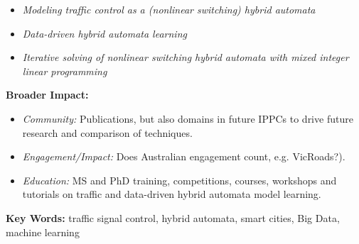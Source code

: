 {\begin{itemize}
\item {\it Modeling traffic control as a (nonlinear switching) hybrid automata}
\item {\it Data-driven hybrid automata learning} 
\item {\it Iterative solving of nonlinear switching hybrid automata with mixed integer linear programming}
\end{itemize}

\blankline

{\bf Broader Impact:}

\begin{itemize}
\item {\it Community:} Publications, but also domains in future IPPCs
  to drive future research and comparison of techniques.
\item {\it Engagement/Impact:} Does Australian engagement count,
  e.g. VicRoads?).
\item {\it Education:} MS and PhD training, competitions, courses,
  workshops and tutorials on traffic and data-driven hybrid automata
  model learning.
\end{itemize}

\blankline

{\bf Key Words:} traffic signal control, hybrid automata, smart cities,
Big Data, machine learning





}
